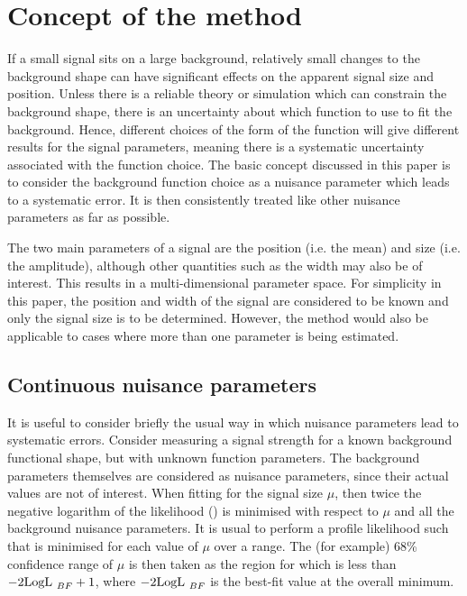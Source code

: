 \section{Concept of the method} %
\label{sec:concept}

If a small signal sits on
a large background, relatively small changes to the background shape can
have significant effects on the apparent signal size and position.
Unless there is a
reliable theory or simulation which can constrain the background shape,
there is an uncertainty about which function to use to fit
the background. Hence, different choices of the form of the function
will give different results for the signal parameters, meaning there is a
systematic uncertainty associated with the function choice.
The basic concept discussed in this paper is to consider the background
function choice as a nuisance parameter which leads to a systematic error.
It is then consistently treated like other nuisance parameters as far as
possible.

The two main parameters of a signal are the position (i.e. the mean)
and size (i.e. the amplitude), although other
quantities such as the width may also be of interest. This results in a
multi-dimensional parameter space. For simplicity in this paper, the position
and width of the signal are considered to be known and only the signal
size is to be determined. However, the method would also be applicable to
cases where more than one parameter is being estimated.

\subsection{Continuous nuisance parameters}
\label{sec:concept:continuous}

It is useful to consider briefly the usual way in which nuisance 
parameters lead to systematic errors. Consider measuring a signal
strength for a known background functional shape, but with unknown function
parameters. The background parameters themselves are considered as
nuisance parameters, since their actual values are not of interest.
When fitting for the signal size $\mu$, then twice the negative logarithm of the
likelihood (\nll) is minimised with respect to $\mu$ and all the background
nuisance parameters. It is usual to perform a profile likelihood
such that \nll is minimised for each value of $\mu$ over a range. 
The (for example) 68\% confidence range of $\mu$ 
is then
taken as the region for which \nll is less than ${\rm -2LogL~}_{BF}+1$,
where ${\rm -2LogL~}_{BF}$ is the best-fit value at the overall minimum.

